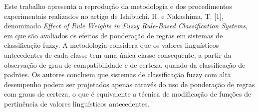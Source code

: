 \documentclass[12pt,a4paper]{article}
\newcommand{\farcm}{\mbox{\ensuremath{.\mkern-4mu^\prime}}}%
\newcommand{\farcs}{\mbox{\ensuremath{.\!\!^{\prime\prime}}}}
\newcommand{\ii }{\'{\i}}
\newcommand{\cc }{\c c}
\newcommand{\cca}{\c ca }
\newcommand{\ao}{\~ao }
\newcommand{\cao}{\c c\~ao }
\newcommand{\oes}{\~oes }
\newcommand{\coes}{\c c\~oes }
\newcommand{\eq}{\begin{equation}}
\newcommand{\feq}{\end{equation}}
\newcommand{\dm}{\begin{displaymath}}
\newcommand{\fdm}{\end{displaymath}}
\newcommand{\eqn}{\begin{eqnarray}}
\newcommand{\feqn}{\end{eqnarray}}
\newcommand{\grau}{^{\circ}}
\newcommand{\ba}{\arrowvert_{t_1}^{t_2}}
\newcommand{\bc}{\arrowvert_{0^{\circ} {\rm C}}^{t_2}}
\newcommand{\bb}{\arrowvert_{0^{\circ} {\rm C}}^{t_1}}
\newcommand{\Ms}{$\mathrm{M}_{\odot}$}
\newcommand{\reg}[1]{#1$^{\tiny{\circledR}}$}
\renewcommand{\baselinestretch}{1.5}
\providecommand{\sin}{} \renewcommand{\sin}{\hspace{2pt}\mathrm{sen}}
\numberwithin{equation}{section}
\begin{document}
%
%

{\abstract
Este trabalho apresenta a reprodução da metodologia e dos procedimentos experimentais realizados no artigo de Ishibuchi, H. e Nakashima, T. [1], denominado \textit{Effect of Rule Weights in Fuzzy Rule-Based Classification Systems}, em que são avaliados os efeitos de ponderação de regras em sistemas de classificação fuzzy. A metodologia considera que os valores linguísticos antecedentes de cada classe tem uma única classe consequente, a partir da observação de grau de compatibilidade e de certeza, quando da classificação de padrões. Os autores concluem que sistemas de classificação fuzzy com alta desempenho podem ser projetados apenas através do uso de ponderação de regras com graus de certeza, o que é equivalente a técnica de modificação de funções de pertinência de valores linguísticos antecedentes.}
\newpage
\end{document}
